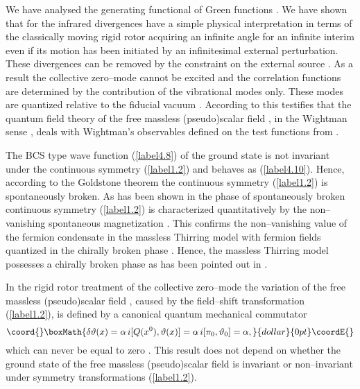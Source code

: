 \documentclass[a4paper,12pt] {article}
\begin{document}
We have analysed the generating functional of Green functions
\coordHE{}. We have shown that for \coordHE{} the infrared
divergences have a simple physical interpretation in terms of the
classically moving rigid rotor acquiring an infinite angle for an
infinite interim even if its motion has been initiated by an
infinitesimal external perturbation. These divergences can be removed
by the constraint on the external source \coordHE{}.  As a
result the collective zero--mode cannot be excited and the correlation
functions are determined by the contribution of the vibrational modes
\coordHE{} only. These modes are quantized relative to
the fiducial vacuum \myHighlight{$|\Psi_0\rangle$}\coordHE{}.  According to
\cite{th0204237,th0206244} this testifies that the quantum field
theory of the free massless (pseudo)scalar field \coordHE{}, in the Wightman sense \cite{Wi64}, deals with Wightman's
observables defined on the test functions from \coordHE{}.

The BCS type wave function (\ref{label4.8}) of the ground state is not
invariant under the continuous symmetry (\ref{label1.2}) and behaves
as (\ref{label4.10}). Hence, according to the Goldstone theorem
\cite{Go61} the continuous symmetry (\ref{label1.2}) is spontaneously
broken. As has been shown in \cite{th0112184,th0204237,th0206244} the
phase of spontaneously broken continuous symmetry (\ref{label1.2}) is
characterized quantitatively by the non--vanishing spontaneous
magnetization \coordHE{}. This confirms the non--vanishing value of
the fermion condensate in the massless Thirring model with fermion
fields quantized in the chirally broken phase \cite{th0105057}. Hence,
the massless Thirring model possesses a chirally broken phase as has
been pointed out in
\cite{th0105057,th0112184,th0204237,th0206244,th0210104,th0205249}.

In the rigid rotor treatment of the collective zero--mode the
variation \coordHE{} of the free massless (pseudo)scalar
field \coordHE{}, caused by the field--shift transformation
(\ref{label1.2}), is defined by a canonical quantum mechanical
commutator
$$\coord{}\boxMath{
\delta \vartheta(x) = \alpha\,i[Q(x^0),\vartheta(x)] =
\alpha\,i[\pi_0,\vartheta_0] = \alpha,
}{dollar}{0pt}\coordE{}$$
which can never be equal to zero \cite{Co73}. This result does not
depend on whether the ground state of the free massless (pseudo)scalar
field is invariant or non--invariant under symmetry transformations
(\ref{label1.2}).
\end{document}
